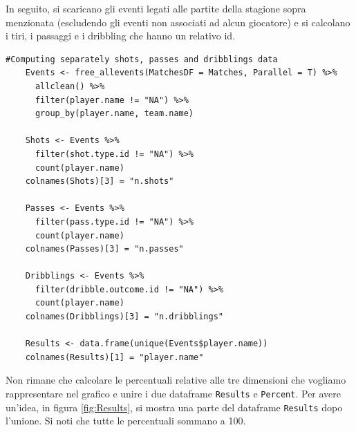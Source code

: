             \vspace{5pt}

            In seguito, si scaricano gli eventi legati alle partite della stagione sopra menzionata (escludendo gli eventi non associati ad alcun giocatore) e si calcolano i tiri, i passaggi e i dribbling che hanno un relativo id.
            
            \vspace{5pt}
            
            \begin{lstlisting}[numbers=None]
    #Computing separately shots, passes and dribblings data
    Events <- free_allevents(MatchesDF = Matches, Parallel = T) %>%
      allclean() %>%
      filter(player.name != "NA") %>%
      group_by(player.name, team.name)
    
    Shots <- Events %>%
      filter(shot.type.id != "NA") %>%
      count(player.name)
    colnames(Shots)[3] = "n.shots"
    
    Passes <- Events %>%
      filter(pass.type.id != "NA") %>%
      count(player.name)
    colnames(Passes)[3] = "n.passes"
    
    Dribblings <- Events %>%
      filter(dribble.outcome.id != "NA") %>%
      count(player.name)
    colnames(Dribblings)[3] = "n.dribblings"
    
    Results <- data.frame(unique(Events$player.name))
    colnames(Results)[1] = "player.name"
            \end{lstlisting}

            \vspace{5pt}

            Non rimane che calcolare le percentuali relative alle tre dimensioni che vogliamo rappresentare nel grafico e unire i due dataframe \texttt{Results} e \texttt{Percent}. Per avere un'idea, in figura \ref{fig:Results}, si mostra una parte del dataframe \texttt{Results} dopo l'unione. Si noti che tutte le percentuali sommano a 100.

            \vspace{5pt}

